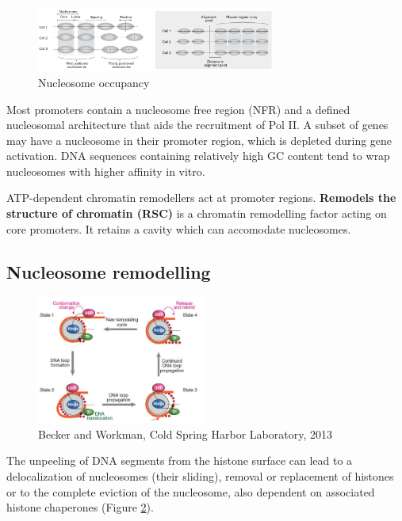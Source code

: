 \begin{figure}
\centering
\includegraphics[width=0.7\textwidth]{../_resources/Screenshot_2022-09-16_at_16-26-04.png}
\caption{Nucleosome occupancy}
\label{fig:nucleosome}
\end{figure}

Most promoters contain a nucleosome free region (NFR) and a defined nucleosomal architecture that aids the recruitment of Pol II. A subset of genes may have a nucleosome in their promoter region, which is depleted during gene activation. DNA sequences containing relatively high GC content tend to wrap nucleosomes with higher affinity in vitro.

ATP-dependent chromatin remodellers act at promoter regions. \textbf{Remodels the structure of chromatin (RSC)} is a chromatin remodelling factor acting on core promoters. It retains a cavity which can accomodate nucleosomes.

\hypertarget{nucleosome-remodelling}{%
\subsection{Nucleosome remodelling}\label{nucleosome-remodelling}}

\begin{figure}
\centering
\includegraphics[width=0.5\textwidth]{../_resources/Screenshot_2022-09-16_at_16-30-29.png}
\caption{Becker and Workman, Cold Spring Harbor Laboratory, 2013}
\label{fig:peeling}
\end{figure}

The unpeeling of DNA segments from the histone surface can lead to a delocalization of nucleosomes (their sliding), removal or replacement of histones or to the complete eviction of the nucleosome, also dependent on associated histone chaperones (Figure \ref{fig:peeling}).

